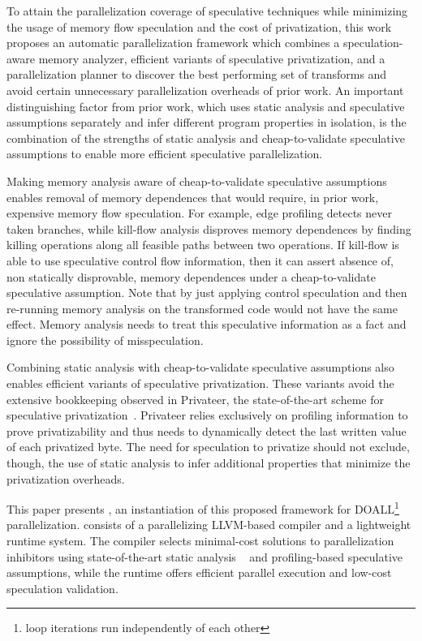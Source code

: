 To attain the parallelization coverage of speculative techniques
while minimizing the usage of memory flow speculation and the cost of
privatization,
%
this work proposes an automatic parallelization framework which
combines a speculation-aware memory analyzer, efficient variants of
speculative privatization, and a parallelization planner
to discover the best performing set of transforms and avoid certain
unnecessary parallelization overheads of prior work.
%
An important distinguishing factor from prior work, which uses static
analysis and speculative assumptions separately and infer different
program properties in isolation, is the combination of the strengths of
static analysis and cheap-to-validate speculative assumptions to
enable more efficient speculative parallelization.

Making memory analysis aware of cheap-to-validate speculative
assumptions enables removal of memory dependences that would require,
in prior work, expensive memory flow speculation.
%
For example, edge profiling detects never taken branches, while
kill-flow analysis disproves memory dependences by finding killing
operations along all feasible paths between two operations. If
kill-flow is able to use speculative control flow information, then it
can assert absence of, non statically disprovable, memory dependences
under a cheap-to-validate speculative assumption.
Note that by just applying control speculation and then re-running
memory analysis on the transformed code would not have the same
effect.  Memory analysis needs to treat this speculative information
as a fact and ignore the possibility of misspeculation.

Combining static analysis with cheap-to-validate speculative
assumptions also enables efficient variants of speculative
privatization.
%
These variants avoid the extensive bookkeeping observed in
Privateer, the state-of-the-art scheme for speculative
privatization~\cite{johnson:12:pldi}.
%
Privateer relies exclusively on profiling
information to prove privatizability and thus needs to dynamically
detect the last written value of each privatized byte.
%
The need for speculation to privatize should not exclude, though, the
use of static analysis to infer additional properties that minimize
the privatization overheads.

This paper presents \name, an instantiation of this proposed framework
for DOALL\footnote{loop iterations run independently of each other}
parallelization. \name consists of a parallelizing LLVM-based compiler
and a lightweight
runtime system. The compiler selects minimal-cost solutions to
parallelization inhibitors using state-of-the-art static analysis
~\cite{johnson:14:pldi} and profiling-based speculative
assumptions, while the runtime offers efficient parallel execution and
low-cost speculation validation.

